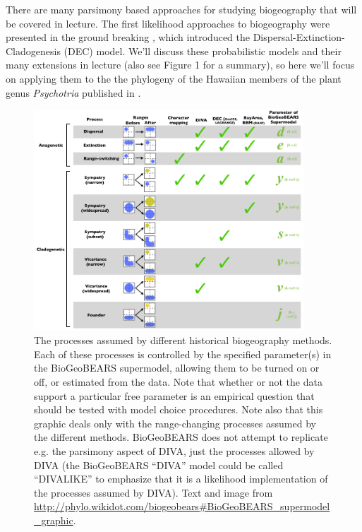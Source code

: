 \documentclass[11pt]{article}
\begin{document}
There are many parsimony based approaches for
studying biogeography that will be covered in lecture.
The first likelihood approaches to biogeography
were presented in the ground breaking \citet{ree2008maximum},
which introduced the Dispersal-Extinction-Cladogenesis (DEC) model.
We'll discuss these probabilistic models and their many
extensions in lecture (also see Figure 1 for a summary),
so here we'll focus on applying them
to the the phylogeny of the Hawaiian members of the
plant genus \textit{Psychotria} published in
\citet{ree2008maximum}.



\begin{figure}
\centering
\includegraphics[width=0.9\textwidth]{BioGeoBEARS_supermodel.png}
\caption{
The processes assumed by different historical biogeography methods. Each of these processes is controlled by the specified parameter(s) in the BioGeoBEARS supermodel, allowing them to be turned on or off, or estimated from the data. Note that whether or not the data support a particular free parameter is an empirical question that should be tested with model choice procedures. Note also that this graphic deals only with the range-changing processes assumed by the different methods. BioGeoBEARS does not attempt to replicate e.g. the parsimony aspect of DIVA, just the processes allowed by DIVA (the BioGeoBEARS ``DIVA'' model could be called ``DIVALIKE'' to emphasize that it is a likelihood implementation of the processes assumed by DIVA).
Text and image from \protect\url{http://phylo.wikidot.com/biogeobears\#BioGeoBEARS\_supermodel\_graphic}.}
\end{figure}
\end{document}
